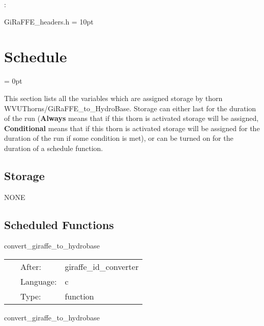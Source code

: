 \documentclass{article}
\begin{document}
\vspace{5mm}

: 

GiRaFFE\_headers.h
\vspace{2mm}\parskip = 10pt 

\section{Schedule} 


\parskip = 0pt


\noindent This section lists all the variables which are assigned storage by thorn WVUThorns/GiRaFFE\_to\_HydroBase.  Storage can either last for the duration of the run ({\bf Always} means that if this thorn is activated storage will be assigned, {\bf Conditional} means that if this thorn is activated storage will be assigned for the duration of the run if some condition is met), or can be turned on for the duration of a schedule function.


\subsection*{Storage}NONE
\subsection*{Scheduled Functions}
\vspace{5mm}


\hspace{5mm} convert\_giraffe\_to\_hydrobase 

\hspace{5mm}{\it convert giraffe-native variables to hydrobase } 


\hspace{5mm}

 \begin{tabular*}{160mm}{cll} 
~ & After:  & giraffe\_id\_converter \\ 
~ & Language:  & c \\ 
~ & Type:  & function \\ 
\end{tabular*} 


\vspace{5mm}


\hspace{5mm} convert\_giraffe\_to\_hydrobase 
\end{document}
